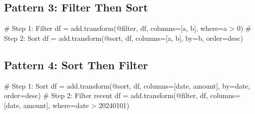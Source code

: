 \documentclass[
  letterpaper,
]{scrbook}
\newenvironment{Shaded}{\begin{snugshade}}{\end{snugshade}}
\newcommand{\CommentTok}[1]{\textcolor[rgb]{0.37,0.37,0.37}{#1}}
\newcommand{\NormalTok}[1]{\textcolor[rgb]{0.00,0.23,0.31}{#1}}
\newcommand{\OperatorTok}[1]{\textcolor[rgb]{0.37,0.37,0.37}{#1}}
\newcommand{\StringTok}[1]{\textcolor[rgb]{0.13,0.47,0.30}{#1}}
\begin{document}
\subsection{Pattern 3: Filter Then
Sort}\label{pattern-3-filter-then-sort}

\begin{Shaded}
\begin{Highlighting}[]
\CommentTok{\# Step 1: Filter}
\NormalTok{df }\OperatorTok{=}\NormalTok{ add.transform(}\StringTok{\textquotesingle{}@filter\textquotesingle{}}\NormalTok{, df, columns}\OperatorTok{=}\NormalTok{[}\StringTok{\textquotesingle{}a\textquotesingle{}}\NormalTok{, }\StringTok{\textquotesingle{}b\textquotesingle{}}\NormalTok{], where}\OperatorTok{=}\StringTok{\textquotesingle{}a \textgreater{} 0\textquotesingle{}}\NormalTok{)}
\CommentTok{\# Step 2: Sort}
\NormalTok{df }\OperatorTok{=}\NormalTok{ add.transform(}\StringTok{\textquotesingle{}@sort\textquotesingle{}}\NormalTok{, df, columns}\OperatorTok{=}\NormalTok{[}\StringTok{\textquotesingle{}a\textquotesingle{}}\NormalTok{, }\StringTok{\textquotesingle{}b\textquotesingle{}}\NormalTok{], by}\OperatorTok{=}\StringTok{\textquotesingle{}b\textquotesingle{}}\NormalTok{, order}\OperatorTok{=}\StringTok{\textquotesingle{}desc\textquotesingle{}}\NormalTok{)}
\end{Highlighting}
\end{Shaded}

\subsection{Pattern 4: Sort Then
Filter}\label{pattern-4-sort-then-filter}

\begin{Shaded}
\begin{Highlighting}[]
\CommentTok{\# Step 1: Sort}
\NormalTok{df }\OperatorTok{=}\NormalTok{ add.transform(}\StringTok{\textquotesingle{}@sort\textquotesingle{}}\NormalTok{, df, columns}\OperatorTok{=}\NormalTok{[}\StringTok{\textquotesingle{}date\textquotesingle{}}\NormalTok{, }\StringTok{\textquotesingle{}amount\textquotesingle{}}\NormalTok{], }
\NormalTok{                   by}\OperatorTok{=}\StringTok{\textquotesingle{}date\textquotesingle{}}\NormalTok{, order}\OperatorTok{=}\StringTok{\textquotesingle{}desc\textquotesingle{}}\NormalTok{)}
\CommentTok{\# Step 2: Filter recent}
\NormalTok{df }\OperatorTok{=}\NormalTok{ add.transform(}\StringTok{\textquotesingle{}@filter\textquotesingle{}}\NormalTok{, df, columns}\OperatorTok{=}\NormalTok{[}\StringTok{\textquotesingle{}date\textquotesingle{}}\NormalTok{, }\StringTok{\textquotesingle{}amount\textquotesingle{}}\NormalTok{], }
\NormalTok{                   where}\OperatorTok{=}\StringTok{\textquotesingle{}date \textgreater{} 20240101\textquotesingle{}}\NormalTok{)}
\end{Highlighting}
\end{Shaded}
\end{document}

